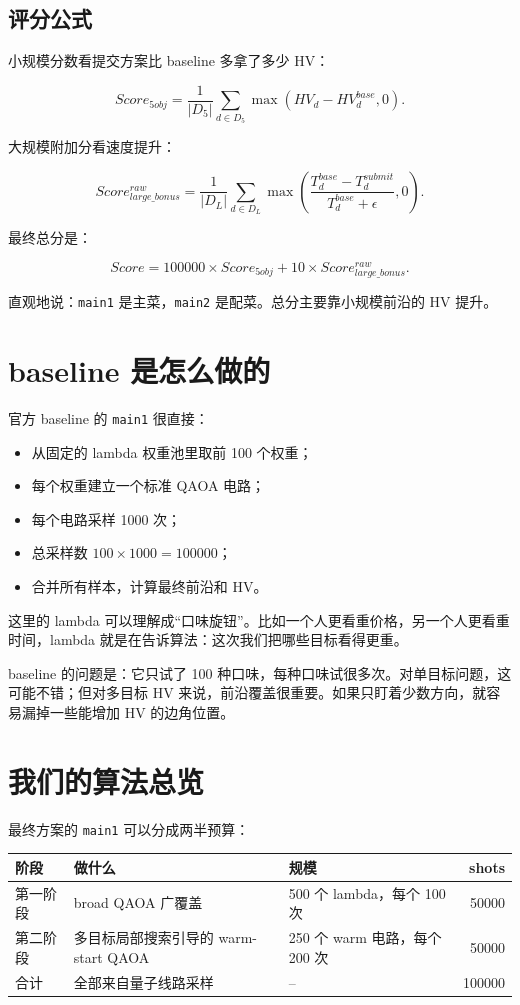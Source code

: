 \documentclass[UTF8,zihao=-4]{ctexart}
\newcommand{\code}[1]{\texttt{#1}}
\begin{document}
\subsection{评分公式}

小规模分数看提交方案比 baseline 多拿了多少 HV：

\[
Score_{5obj}
=
\frac{1}{|D_5|}
\sum_{d\in D_5}
\max(HV_d-HV_d^{base},0).
\]

大规模附加分看速度提升：

\[
Score_{large\_bonus}^{raw}
=
\frac{1}{|D_L|}
\sum_{d\in D_L}
\max\left(
\frac{T_d^{base}-T_d^{submit}}{T_d^{base}+\epsilon},
0
\right).
\]

最终总分是：

\[
Score
=
100000\times Score_{5obj}
+
10\times Score_{large\_bonus}^{raw}.
\]

直观地说：\code{main1} 是主菜，\code{main2} 是配菜。总分主要靠小规模前沿的 HV 提升。

\section{baseline 是怎么做的}

官方 baseline 的 \code{main1} 很直接：

\begin{itemize}
  \item 从固定的 lambda 权重池里取前 100 个权重；
  \item 每个权重建立一个标准 QAOA 电路；
  \item 每个电路采样 1000 次；
  \item 总采样数 \(100\times 1000=100000\)；
  \item 合并所有样本，计算最终前沿和 HV。
\end{itemize}

这里的 lambda 可以理解成“口味旋钮”。比如一个人更看重价格，另一个人更看重时间，lambda 就是在告诉算法：这次我们把哪些目标看得更重。

baseline 的问题是：它只试了 100 种口味，每种口味试很多次。对单目标问题，这可能不错；但对多目标 HV 来说，前沿覆盖很重要。如果只盯着少数方向，就容易漏掉一些能增加 HV 的边角位置。

\section{我们的算法总览}

最终方案的 \code{main1} 可以分成两半预算：

\begin{center}
\begin{tabular}{p{2.2cm}p{4.3cm}p{5.5cm}r}
\toprule
阶段 & 做什么 & 规模 & shots \\
\midrule
第一阶段 & broad QAOA 广覆盖 & 500 个 lambda，每个 100 次 & 50000 \\
第二阶段 & 多目标局部搜索引导的 warm-start QAOA & 250 个 warm 电路，每个 200 次 & 50000 \\
\midrule
合计 & 全部来自量子线路采样 & -- & 100000 \\
\bottomrule
\end{tabular}
\end{center}
\end{document}
